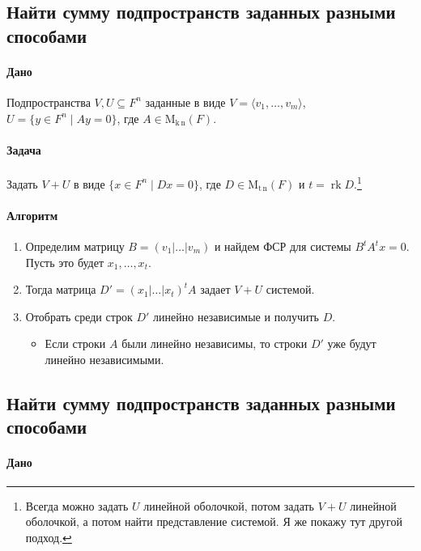 \documentclass{article}
\newcommand{\MatrixDim}[3]{\operatorname{\mathrm{M}_{#2\,#3}}(#1)}
\newcommand{\rk}{\operatorname{rk}}
\begin{document}
\subsection{Найти сумму подпространств заданных разными способами}

\paragraph{Дано}

Подпространства $V,U\subseteq F^{n}$ заданные в виде $V =\langle v_1,\ldots,v_m\rangle$, $U = \{y\in F^{n}\mid Ay = 0\}$, где $A\in \MatrixDim{F}{k}{n}$.

\paragraph{Задача}

Задать $V + U$ в виде $\{x\in F^n \mid Dx = 0\}$, где $D\in \MatrixDim{F}{t}{n}$ и $t = \rk D$.\footnote{Всегда можно задать $U$ линейной оболочкой, потом задать $V+U$ линейной оболочкой, а потом найти представление системой. Я же покажу тут другой подход.}

\paragraph{Алгоритм}
\begin{enumerate}
\item Определим матрицу $B = (v_1|\ldots|v_m)$ и найдем ФСР для системы $B^tA^t x = 0$. Пусть это будет $x_1,\ldots, x_t$.

\item Тогда матрица $D' = (x_1|\ldots|x_t)^tA$ задает $V + U$ системой.

\item Отобрать среди строк $D'$ линейно независимые и получить $D$.
\begin{itemize}
\item Если строки $A$ были линейно независимы, то строки $D'$ уже будут линейно независимыми.
\end{itemize}
\end{enumerate}


\subsection{Найти сумму подпространств заданных разными способами}

\paragraph{Дано}
\end{document}
